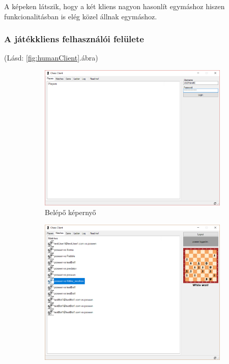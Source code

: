 \documentclass[twoside, a4paper, 12pt]{article}
\begin{document}
A képeken látszik, hogy a két kliens nagyon hasonlít egymáshoz hiszen funkcionalitásban is elég közel állnak egymáshoz.

\subsubsection{A játékkliens felhasználói felülete}
(Lásd: \ref{fig:humanClient}.ábra)

\begin{figure}
	\centering
	\begin{subfigure}[b]{0.475\textwidth}
		\centering
		\includegraphics[width=\textwidth]{img/humanClientLogin.png}
		\caption{Belépő képernyő}
		\label{humanClientLogin}
	\end{subfigure}
	\hfill
	\begin{subfigure}[b]{0.475\textwidth}  
		\centering 
		\includegraphics[width=\textwidth]{img/humanClientMatches.png}

\end{subfigure}
\end{figure}
\end{document}
